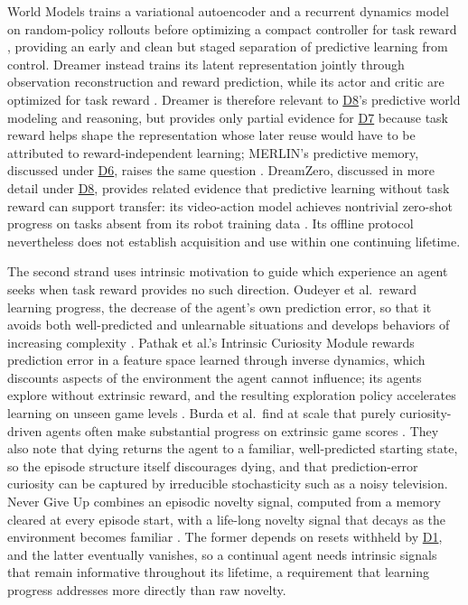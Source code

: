 \documentclass[10pt,journal,compsoc]{IEEEtran}
\DeclareRobustCommand{\Dref}[1]{\hyperref[sec:d#1]{D#1}}
\begin{document}
World Models trains a variational autoencoder and a recurrent dynamics model on random-policy rollouts before optimizing a compact controller for task reward \cite{ha2018}, providing an early and clean but staged separation of predictive learning from control.
Dreamer instead trains its latent representation jointly through observation reconstruction and reward prediction, while its actor and critic are optimized for task reward \cite{hafner2020}.
Dreamer is therefore relevant to \Dref{8}'s predictive world modeling and reasoning, but provides only partial evidence for \Dref{7} because task reward helps shape the representation whose later reuse would have to be attributed to reward-independent learning; MERLIN's predictive memory, discussed under \Dref{6}, raises the same question \cite{wayne2018}.
DreamZero, discussed in more detail under \Dref{8}, provides related evidence that predictive learning without task reward can support transfer: its video-action model achieves nontrivial zero-shot progress on tasks absent from its robot training data \cite{ye2026}.
Its offline protocol nevertheless does not establish acquisition and use within one continuing lifetime.

The second strand uses intrinsic motivation to guide which experience an agent seeks when task reward provides no such direction.
Oudeyer et al.\ reward learning progress, the decrease of the agent's own prediction error, so that it avoids both well-predicted and unlearnable situations and develops behaviors of increasing complexity \cite{oudeyer2007}.
Pathak et al.'s Intrinsic Curiosity Module rewards prediction error in a feature space learned through inverse dynamics, which discounts aspects of the environment the agent cannot influence; its agents explore without extrinsic reward, and the resulting exploration policy accelerates learning on unseen game levels \cite{pathak2017}.
Burda et al.\ find at scale that purely curiosity-driven agents often make substantial progress on extrinsic game scores \cite{burda2019}.
They also note that dying returns the agent to a familiar, well-predicted starting state, so the episode structure itself discourages dying, and that prediction-error curiosity can be captured by irreducible stochasticity such as a noisy television.
Never Give Up combines an episodic novelty signal, computed from a memory cleared at every episode start, with a life-long novelty signal that decays as the environment becomes familiar \cite{badia2020}.
The former depends on resets withheld by \Dref{1}, and the latter eventually vanishes, so a continual agent needs intrinsic signals that remain informative throughout its lifetime, a requirement that learning progress addresses more directly than raw novelty.
\end{document}
